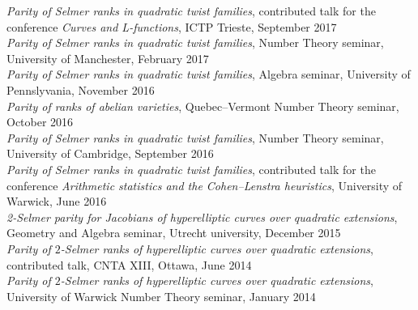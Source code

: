 \documentclass{res}
\begin{document}
\begin{resume}
{\it Parity of Selmer ranks in quadratic twist families}, contributed talk for the conference {\it Curves and L-functions}, ICTP Trieste, September 2017  \medskip \\
{\it Parity of Selmer ranks in quadratic twist families}, Number Theory seminar, University of Manchester, February 2017  \medskip \\
{\it Parity of Selmer ranks in quadratic twist families}, Algebra seminar, University of Pennslyvania, November 2016  \medskip \\
{\it Parity of ranks of abelian varieties}, Quebec--Vermont Number Theory seminar, October 2016  \medskip \\
{\it Parity of Selmer ranks in quadratic twist families}, Number Theory seminar, University of Cambridge, September 2016  \medskip \\
{\it Parity of Selmer ranks in quadratic twist families}, contributed talk for the conference  {\it Arithmetic statistics and the Cohen--Lenstra heuristics}, University of Warwick, June 2016  \medskip \\
{\it 2-Selmer parity for Jacobians of hyperelliptic curves over quadratic extensions}, Geometry and Algebra seminar, Utrecht university, December 2015  \medskip \\
 {\it Parity of $2$-Selmer ranks of hyperelliptic curves over quadratic extensions}, contributed talk, CNTA XIII, Ottawa, June 2014  \medskip \\
 {\it Parity of $2$-Selmer ranks of hyperelliptic curves over quadratic extensions}, University of Warwick Number Theory seminar, January 2014  \medskip \\
       

\end{resume}
\end{document}
